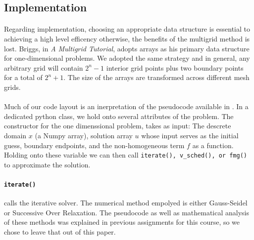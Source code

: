 \documentclass[pdftex,12pt,a4paper]{article}
\begin{document}
    \subsection{Implementation}   

        \paragraph*{} Regarding implementation, choosing an appropriate data structure is essential to achieving a high level efficency otherwise, the benefits of the multigrid method is lost.  Briggs, \cite{briggs} in \textit{A Multigrid Tutorial}, adopts arrays as his primary data structure for one-dimensional problems.  We adopted the same strategy and in general, any arbitrary grid will contain $2^{n}-1$ interior grid points plus two boundary points for a total of $2^{n}+1$.  The size of the arrays are transformed across different mesh grids. 

        \paragraph*{} Much of our code layout is an inerpretation of the pseudocode available in \cite{green}. In a dedicated python class, we hold onto several attributes of the problem. The constructor for the one dimenssional problem, takes as input: The descrete domain $x$ (a Numpy array), solution array $u$ whose input serves as the initial guess, boundary endpoints, and the non-homogeneous term $f$ as a function. Holding onto these variable we can then call \lstinline{iterate(), v_sched(), or fmg()} to approximate the solution.

        \paragraph*{\lstinline{iterate()}}calls the iterative solver. The numerical method empolyed is either Gauss-Seidel or Successive Over Relaxation. The pseudocode as well as mathematical analysis of these methods was explained in previous assignments for this course, so we chose to leave that out of this paper.\cite{mandli} 
\end{document}
